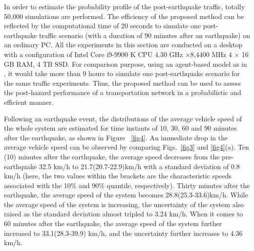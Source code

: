 \documentclass[review,11pt,nonatbib]{elsarticle}
\begin{document}
\par  In order to estimate the probability profile of the post-earthquake traffic, totally 50,000 simulations are performed. The efficiency of the proposed method can be reflected by the computational time of 20 seconds to simulate one post-earthquake traffic scenario (with a duration of 90 minutes after an earthquake) on an ordinary PC. All the experiments in this section are conducted on a desktop with a configuration of Intel Core i9-9900 K CPU 4.30 GHz ×8,4400 MHz 4 $\times$ 16 GB RAM, 4 TB SSD. For comparison purpose, using an agent-based model as in  \citep{feng2017post}, it would take more than 9 hours to simulate one post-earthquake scenario for the same traffic experiments. Thus, the proposed method can be used to assess the post-hazard performance of a transportation network in a probabilistic and efficient manner. 

\par Following an earthquake event, the distributions of the average vehicle speed of the whole system are estimated for time instants of 10, 30, 60 and 90 minutes after the earthquake, as shown in Figure ~\ref{fig4}. An immediate drop in the average vehicle speed can be observed by comparing Figs.~\ref{fig3} and \ref{fig4}(a). Ten (10) minutes after the earthquake, the average speed decreases from the pre-earthquake 32.5 km/h to 21.7(20.7-22.9)km/h with a standard deviation of 0.8 km/h (here, the two values within the brackets are the characteristic speeds associated with the 10\% and 90\% quantile, respectively). Thirty minutes after the earthquake, the average speed of the system becomes 28.8(25.3-33.6)km/h. While the average speed of the system is increasing, the uncertainty of the system also raised as the standard deviation almost tripled to 3.24 km/h. When it comes to 60 minutes after the earthquake, the average speed of the system further increased to 33.1(28.3-39.9) km/h, and the uncertainty further increases to 4.36 km/h. 
\end{document}
